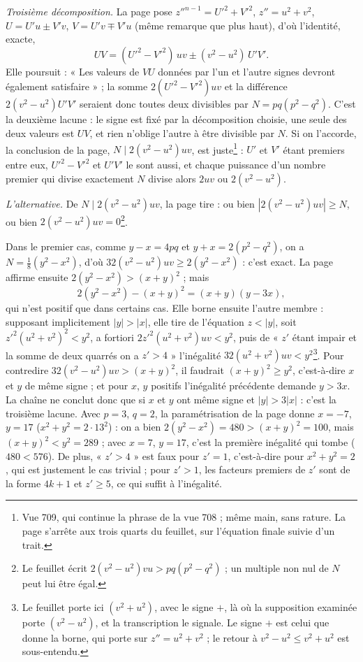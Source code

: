 \documentclass[11pt,a4paper]{article}
\begin{document}
\emph{Troisième décomposition.} La page pose $z''^{n-1}=U'^2+V'^2$, $z''=u^2+v^2$, $U=U'u\pm V'v$, $V=U'v\mp V'u$ (même remarque que plus haut), d'où l'identité, exacte,
\[ UV=(U'^2-V'^2)\,uv\pm(v^2-u^2)\,U'V'. \]
Elle poursuit : « Les valeurs de $VU$ données par l'un et l'autre signes devront également satisfaire » ; la somme $2(U'^2-V'^2)uv$ et la différence $2(v^2-u^2)U'V'$ seraient donc toutes deux divisibles par $N=pq(p^2-q^2)$. C'est la deuxième lacune : le signe est fixé par la décomposition choisie, une seule des deux valeurs est $UV$, et rien n'oblige l'autre à être divisible par $N$. Si on l'accorde, la conclusion de la page, $N\mid 2(v^2-u^2)uv$, est juste\footnote{Vue 709, qui continue la phrase de la vue 708 ; même main, sans rature. La page s'arrête aux trois quarts du feuillet, sur l'équation finale suivie d'un trait.} : $U'$ et $V'$ étant premiers entre eux, $U'^2-V'^2$ et $U'V'$ le sont aussi, et chaque puissance d'un nombre premier qui divise exactement $N$ divise alors $2uv$ ou $2(v^2-u^2)$.

\emph{L'alternative.} De $N\mid 2(v^2-u^2)uv$, la page tire : ou bien $|2(v^2-u^2)uv|\ge N$, ou bien $2(v^2-u^2)uv=0$\footnote{Le feuillet écrit $2(v^2-u^2)vu>pq(p^2-q^2)$ ; un multiple non nul de $N$ peut lui être égal.}.

Dans le premier cas, comme $y-x=4pq$ et $y+x=2(p^2-q^2)$, on a $N=\tfrac18(y^2-x^2)$, d'où $32(v^2-u^2)uv\ge 2(y^2-x^2)$ : c'est exact. La page affirme ensuite $2(y^2-x^2)>(x+y)^2$ ; mais
\[ 2(y^2-x^2)-(x+y)^2=(x+y)(y-3x), \]
qui n'est positif que dans certains cas. Elle borne ensuite l'autre membre : supposant implicitement $|y|>|x|$, elle tire de l'équation $z<|y|$, soit $z'^2(u^2+v^2)^2<y^2$, a fortiori $2z'^2(u^2+v^2)uv<y^2$, puis de « $z'$ étant impair et la somme de deux quarrés on a $z'>4$ » l'inégalité $32(u^2+v^2)uv<y^2$\footnote{Le feuillet porte ici $(v^2+u^2)$, avec le signe $+$, là où la supposition examinée porte $(v^2-u^2)$, et la transcription le signale. Le signe $+$ est celui que donne la borne, qui porte sur $z''=u^2+v^2$ ; le retour à $v^2-u^2\le v^2+u^2$ est sous-entendu.}. Pour contredire $32(v^2-u^2)uv>(x+y)^2$, il faudrait $(x+y)^2\ge y^2$, c'est-à-dire $x$ et $y$ de même signe ; et pour $x$, $y$ positifs l'inégalité précédente demande $y>3x$. La chaîne ne conclut donc que si $x$ et $y$ ont même signe et $|y|>3|x|$ : c'est la troisième lacune. Avec $p=3$, $q=2$, la paramétrisation de la page donne $x=-7$, $y=17$ ($x^2+y^2=2\cdot 13^2$) : on a bien $2(y^2-x^2)=480>(x+y)^2=100$, mais $(x+y)^2<y^2=289$ ; avec $x=7$, $y=17$, c'est la première inégalité qui tombe ($480<576$). De plus, « $z'>4$ » est faux pour $z'=1$, c'est-à-dire pour $x^2+y^2=2$, qui est justement le cas trivial ; pour $z'>1$, les facteurs premiers de $z'$ sont de la forme $4k+1$ et $z'\ge 5$, ce qui suffit à l'inégalité.
\end{document}

